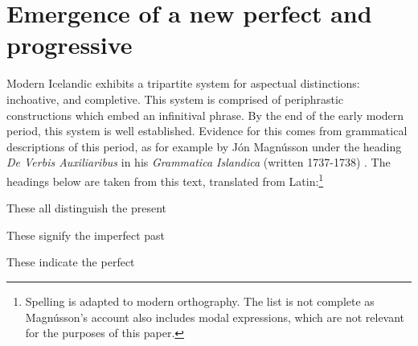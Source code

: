 \documentclass[output=paper,colorlinks,citecolor=brown]{langscibook}
\begin{document}
\section{Emergence of a new perfect and progressive}\label{sec:Chark2}

Modern Icelandic exhibits a tripartite system for aspectual distinctions: inchoative,   and completive. This system is comprised of periphrastic constructions which embed an infinitival phrase. By the end of the early modern period, this system is well established. Evidence for this comes from grammatical descriptions of this period, as for example by Jón Magnússon under the heading \textit{De Verbis Auxiliaribus} in his \textit{Grammatica Islandica} (written 1737-1738) \citep{jonsson1933islandske}. The headings below are taken from this text, translated from Latin:\footnote{Spelling is adapted to modern orthography. The list is not complete as Magnússon's account also includes modal expressions, which are not relevant for the purposes of this paper.}

\ea These all distinguish the present
\z 
  \z

\ea These signify the imperfect past
  \z 
\z

\ea These indicate the perfect
  \z 
\z
\end{document}

